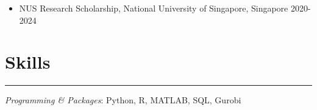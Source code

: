 \documentclass[12pt, a4paper]{article}
\begin{document}
{\begin{itemize}[leftmargin=26pt, itemsep=1pt, parsep=0.5pt, topsep=1pt]
	\item NUS Research Scholarship, National University of Singapore, Singapore \hfill 2020-2024
	



\end{itemize}




\section*{Skills}
\vspace*{0.4em}
\hrule height 0.5pt

{\it Programming \& Packages}: Python, R, MATLAB, SQL, Gurobi

}



\end{document}
